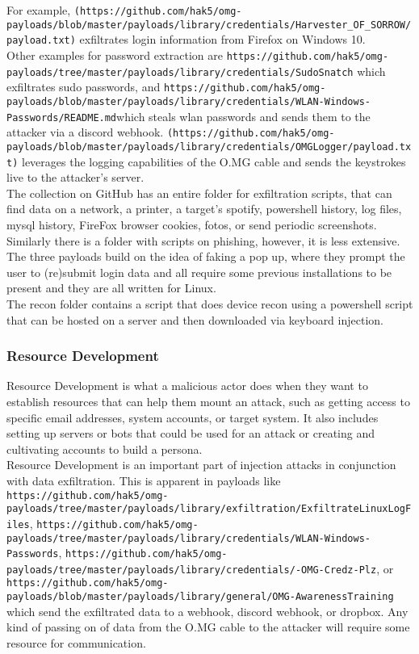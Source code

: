 For example, \verb|(https://github.com/hak5/omg-payloads/blob/master/payloads/library/credentials/Harvester_OF_SORROW/payload.txt)| %
exfiltrates login information from Firefox on Windows 10. \\ 
Other examples for password extraction are \verb|https://github.com/hak5/omg-payloads/tree/master/payloads/library/credentials/SudoSnatch| which exfiltrates sudo passwords, and \verb|https://github.com/hak5/omg-payloads/blob/master/payloads/library/credentials/WLAN-Windows-Passwords/README.md|which steals wlan passwords and sends them to the attacker via a discord webhook. 
\verb|(https://github.com/hak5/omg-payloads/blob/master/payloads/library/credentials/OMGLogger/payload.txt)| leverages the logging capabilities of the O.MG cable and sends the keystrokes live to the attacker's server. \\
The collection on GitHub has an entire folder for exfiltration scripts, that can find data on a network, a printer, a target's spotify, powershell history, log files, mysql history, FireFox browser cookies, fotos, or send periodic screenshots. \\
Similarly there is a folder with scripts on phishing, however, it is less extensive. The three payloads build on the idea of faking a pop up, where they prompt the user to (re)submit login data and all require some previous installations to be present and they are all written for Linux. \\
The recon folder contains a script that does device recon using a powershell script that can be hosted on a server and then downloaded via keyboard injection. 


\subsubsection{Resource Development}

Resource Development is what a malicious actor does when they want to establish resources that can help them mount an attack, such as getting access to specific email addresses, system accounts, or target system. It also includes setting up servers or bots that could be used for an attack or creating and cultivating accounts to build a persona. \\
Resource Development is an important part of injection attacks in conjunction with data exfiltration. This is apparent in payloads like \verb|https://github.com/hak5/omg-payloads/tree/master/payloads/library/exfiltration/ExfiltrateLinuxLogFiles|, \verb|https://github.com/hak5/omg-payloads/tree/master/payloads/library/credentials/WLAN-Windows-Passwords|, \verb|https://github.com/hak5/omg-payloads/tree/master/payloads/library/credentials/-OMG-Credz-Plz|, or \verb|https://github.com/hak5/omg-payloads/blob/master/payloads/library/general/OMG-AwarenessTraining| which send the exfiltrated data to a webhook, discord webhook, or dropbox. Any kind of passing on of data from the O.MG cable to the attacker will require some resource for communication. 


